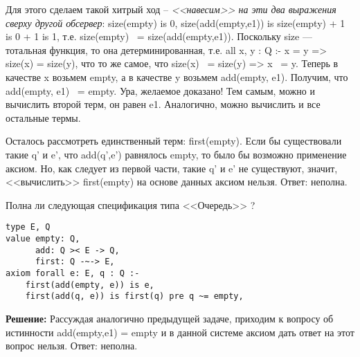 Для этого сделаем такой хитрый ход -- \emph{<<навесим>> на эти два выражения сверху другой обсервер}: size(empty) is 0, size(add(empty,e1)) is size(empty) + 1 is 0 + 1 is 1, т.е. size(empty) ~= size(add(empty,e1)). Поскольку size --- тотальная функция, то она детерминированная, т.е. all x, y : Q :- x = y => size(x) = size(y), что то же самое, что size(x) ~= size(y) => x ~= y. Теперь в качестве x возьмем empty, а в качестве y возьмем add(empty, e1). Получим, что add(empty, e1) ~= empty. Ура, желаемое доказано! Тем самым, можно и вычислить второй терм, он равен e1. Аналогично, можно вычислить и все остальные термы.

Осталось рассмотреть единственный терм: first(empty). Если бы существовали такие q' и e', что add(q',e') равнялось empty, то было бы возможно применение аксиом. Но, как следует из первой части, такие q' и e' не существуют, значит, <<вычислить>> first(empty) на основе данных аксиом нельзя. Ответ: неполна.

\z Полна ли следующая спецификация типа <<Очередь>> ?
\begin{lstlisting}
type E, Q
value empty: Q,
      add: Q >< E -> Q,
      first: Q -~-> E,
axiom forall e: E, q : Q :-
    first(add(empty, e)) is e,
    first(add(q, e)) is first(q) pre q ~= empty,
\end{lstlisting}

\textbf{Решение:}
Рассуждая аналогично предыдущей задаче, приходим к вопросу об истинности add(empty,e1) = empty и в данной системе аксиом дать ответ на этот вопрос нельзя. Ответ: неполна.



%
%


